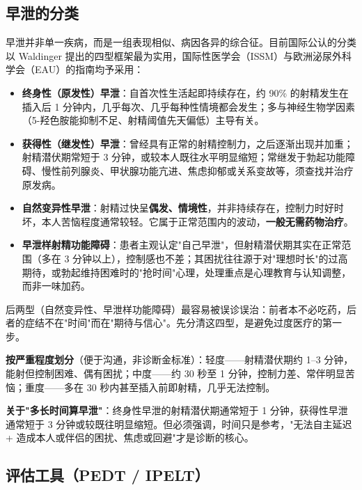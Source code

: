 \subsection{早泄的分类}

早泄并非单一疾病，而是一组表现相似、病因各异的综合征。目前国际公认的分类以 Waldinger 提出的四型框架最为实用，国际性医学会（ISSM）与欧洲泌尿外科学会（EAU）的指南均予采用：

\begin{itemize}
	\item \textbf{终身性（原发性）早泄}：自首次性生活起即持续存在，约 90\% 的射精发生在插入后 1 分钟内，几乎每次、几乎每种性情境都会发生；多与神经生物学因素（5-羟色胺能抑制不足、射精阈值先天偏低）主导有关。
	\item \textbf{获得性（继发性）早泄}：曾经具有正常的射精控制力，之后逐渐出现并加重；射精潜伏期常短于 3 分钟，或较本人既往水平明显缩短；常继发于勃起功能障碍、慢性前列腺炎、甲状腺功能亢进、焦虑抑郁或关系变故等，须查找并治疗原发病。
	\item \textbf{自然变异性早泄}：射精过快呈\textbf{偶发、情境性}，并非持续存在，控制力时好时坏，本人苦恼程度通常较轻。它属于正常范围内的波动，\textbf{一般无需药物治疗}。
	\item \textbf{早泄样射精功能障碍}：患者主观认定"自己早泄"，但射精潜伏期其实在正常范围（多在 3 分钟以上），控制感也不差；其困扰往往源于对"理想时长"的过高期待，或勃起维持困难时的"抢时间"心理，处理重点是心理教育与认知调整，而非一味加药。
\end{itemize}

\begin{tcolorbox}[colback=pink!5!white,colframe=red!50!black,title=贴心小叮咛]
后两型（自然变异性、早泄样功能障碍）最容易被误诊误治：前者本不必吃药，后者的症结不在"时间"而在"期待与信心"。先分清这四型，是避免过度医疗的第一步。
\end{tcolorbox}

\noindent\textbf{按严重程度划分}（便于沟通，非诊断金标准）：轻度——射精潜伏期约 1--3 分钟，能射但控制困难、偶有困扰；中度——约 30 秒至 1 分钟，控制力差、常伴明显苦恼；重度——多在 30 秒内甚至插入前即射精，几乎无法控制。

\noindent\textbf{关于"多长时间算早泄"}：终身性早泄的射精潜伏期通常短于 1 分钟，获得性早泄通常短于 3 分钟或较既往明显缩短。但必须强调，时间只是参考，"无法自主延迟 + 造成本人或伴侣的困扰、焦虑或回避"才是诊断的核心。

\subsection{评估工具（PEDT / IPELT）}

